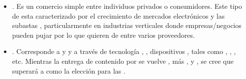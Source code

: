 \begin{itemize}

	\item \textbf{\ctoc}. Es un comercio simple entre individuos privados o consumidores. Este tipo de \ecommerceCOM esta caracterizado por el crecimiento de mercados electrónicos y las subastas \online, particularmente en industrias verticales donde empresas/negocios pueden pujar por lo que quieren de entre varios proveedores.

	\item \textbf{\mcommerce}. Corresponde a \buyingCOM y \sellingCOM \itemsCOM y \servicesCOM a través de tecnología \wirelessPC, \ieCPT, dispositivos \handheldPC, tales como \smartphonesCPT, \pdasCPT, \tabletsINT, etc. Mientras la entrega de contenido  por \devicesINT \wirelessPC se vuelve \fasterQA, más \secureQA, y \scalableQA, se cree que \mcommerce superará a \wirelinePC \ecommerceCOM como la elección para las \transactionsDB \commerceCOM.
	
\end{itemize}

